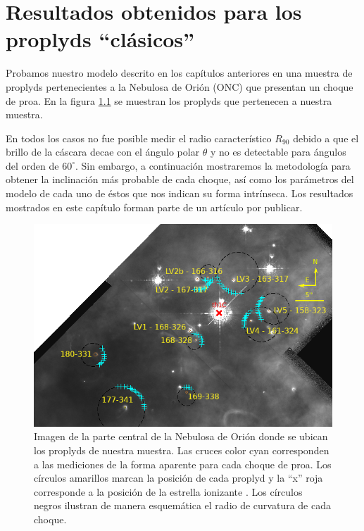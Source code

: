 \chapter[Resultados Obtenidos]{Resultados obtenidos para los proplyds ``clásicos''}
\label{chap:proplyds}
\thispagestyle{empty}
Probamos nuestro modelo descrito en los capítulos anteriores en una muestra de proplyds pertenecientes a la Nebulosa de Orión (ONC) que presentan un choque de proa. En la figura \ref{fig:proplyds-map} se muestran los proplyds que pertenecen a nuestra muestra.

En todos los casos no fue posible medir el radio característico $R_{90}$ debido a que el brillo de la cáscara decae con el ángulo polar $\theta$ y no es detectable para ángulos del orden de $60^\circ$. Sin embargo, a continuación mostraremos la metodología para obtener la inclinación más probable de cada choque, así como los parámetros del modelo de cada uno de éstos que nos indican su forma intrínseca. Los resultados mostrados en este capítulo forman parte de un artículo por publicar.

\begin{figure}
  \centering
    \includegraphics[width=\linewidth]{./Figures/Trapezium-annotate-rob-2018}
    \caption{Imagen de la parte central de la Nebulosa de Orión donde se ubican los proplyds de nuestra muestra. Las cruces color cyan corresponden a las mediciones de la forma aparente para cada choque de proa. Los círculos amarillos marcan la posición de cada proplyd y la ``x'' roja corresponde a la posición de la estrella ionizante \thC{}. Los círculos negros ilustran de manera esquemática el radio de curvatura de cada choque.}
    \label{fig:proplyds-map}
\end{figure}

